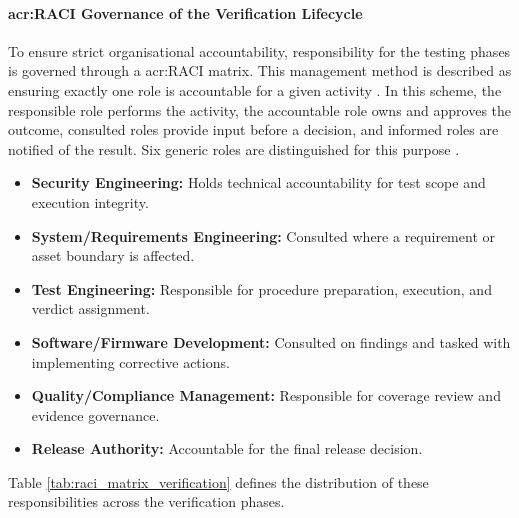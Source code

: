 \paragraph{\gls{acr:RACI} Governance of the Verification Lifecycle}
\label{sec:raci_governance}

To ensure strict organisational accountability, responsibility for the testing phases is governed through a \gls{acr:RACI} matrix. This management method is described as ensuring exactly one role is accountable for a given activity \cite{cybersierra_security_raci_2026, su13041806}. In this scheme, the responsible role performs the activity, the accountable role owns and approves the outcome, consulted roles provide input before a decision, and informed roles are notified of the result. Six generic roles are distinguished for this purpose \cite[p. 6]{Schmidt2026CybersecurityTestProcess}. 

\begin{itemize}
	\item \textbf{Security Engineering:} Holds technical accountability for test scope and execution integrity.
	\item \textbf{System/Requirements Engineering:} Consulted where a requirement or asset boundary is affected.
	\item \textbf{Test Engineering:} Responsible for procedure preparation, execution, and verdict assignment.
	\item \textbf{Software/Firmware Development:} Consulted on findings and tasked with implementing corrective actions.
	\item \textbf{Quality/Compliance Management:} Responsible for coverage review and evidence governance.
	\item \textbf{Release Authority:} Accountable for the final release decision.
\end{itemize}

Table \ref{tab:raci_matrix_verification} defines the distribution of these responsibilities across the verification phases.

